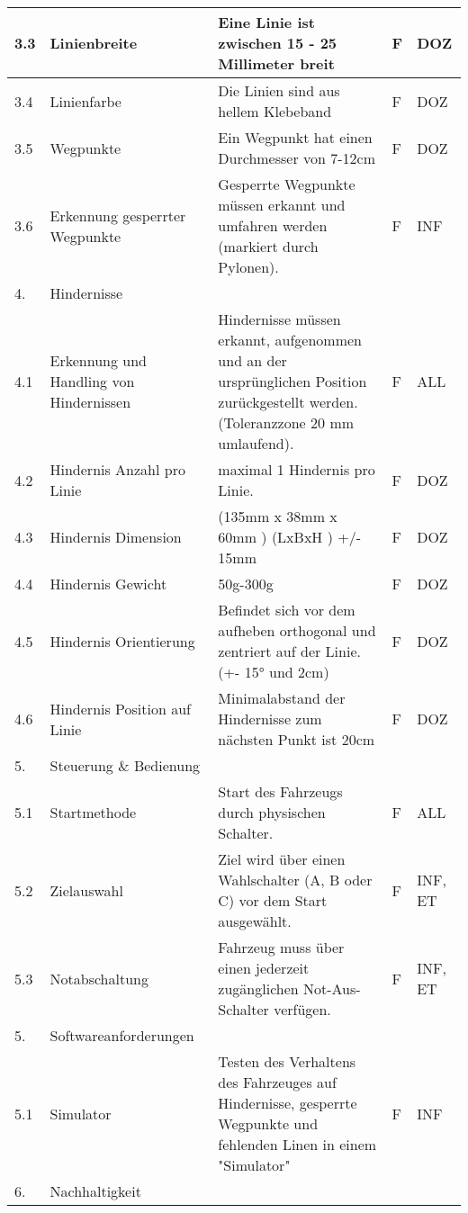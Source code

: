 \begin{longtable}[]{@{}lp{4cm}p{8cm}ll}
        3.3 & Linienbreite & Eine Linie ist zwischen 15 - 25 Millimeter breit & F & DOZ \\ \hline
        3.4 & Linienfarbe & Die Linien sind aus hellem Klebeband & F   & DOZ \\ \hline
        3.5 & Wegpunkte & Ein Wegpunkt hat einen Durchmesser von 7-12cm & F & DOZ \\ \hline
        3.6 & Erkennung gesperrter Wegpunkte & Gesperrte Wegpunkte müssen erkannt und umfahren werden (markiert durch Pylonen). & F & INF \\ \hline
        4. & Hindernisse & ~ & ~ & ~ \\ \hline
        4.1 & Erkennung und Handling von Hindernissen & Hindernisse müssen erkannt, aufgenommen und an der ursprünglichen Position zurückgestellt werden. (Toleranzzone 20 mm umlaufend).  & F & ALL \\ \hline
        4.2 & Hindernis Anzahl pro Linie & maximal 1 Hindernis pro Linie. & F & DOZ \\ \hline
        4.3 & Hindernis Dimension & (135mm x 38mm x 60mm ) (LxBxH ) +/- 15mm & F & DOZ \\ \hline
        4.4 & Hindernis Gewicht & 50g-300g & F & DOZ \\ \hline
        4.5 & Hindernis Orientierung & Befindet sich vor dem aufheben orthogonal und zentriert auf der Linie.(+- 15° und 2cm) & F & DOZ \\ \hline
        4.6 & Hindernis Position auf Linie & Minimalabstand der Hindernisse zum nächsten Punkt ist 20cm & F & DOZ \\ \hline
        5. & Steuerung \& Bedienung & ~ & ~ & ~ \\ \hline
        5.1 & Startmethode & Start des Fahrzeugs durch physischen Schalter. & F & ALL \\ \hline
        5.2 & Zielauswahl & Ziel wird über einen Wahlschalter (A, B oder C) vor dem Start ausgewählt. & F & INF, ET \\ \hline
        5.3 & Notabschaltung & Fahrzeug muss über einen jederzeit zugänglichen Not-Aus-Schalter verfügen. & F & INF, ET \\ \hline
        5. & Softwareanforderungen & ~ & ~ & ~ \\ \hline
        5.1 & Simulator & Testen des Verhaltens des Fahrzeuges auf Hindernisse, gesperrte Wegpunkte und fehlenden Linen in einem "Simulator"  & F & INF \\ \hline
        6. & Nachhaltigkeit & ~ & ~ & ~ \\ \hline

\end{longtable}
